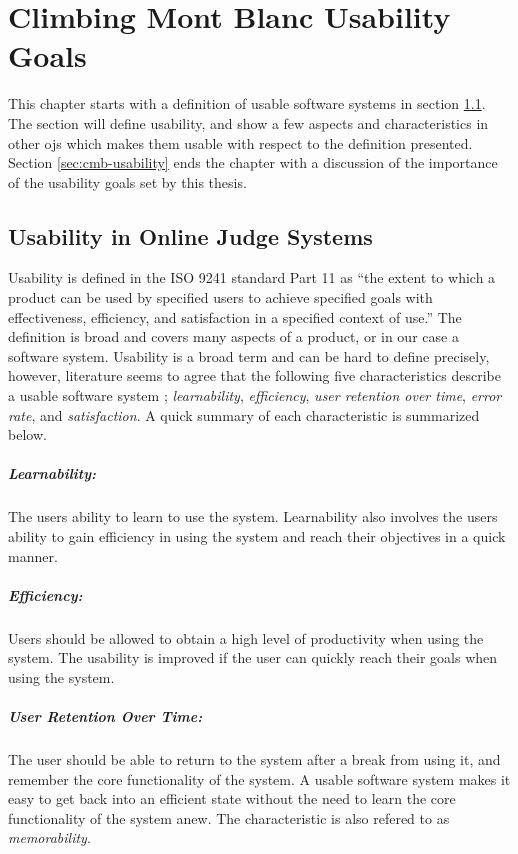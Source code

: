 \chapter{Climbing Mont Blanc Usability Goals}
\label{ch:design}
This chapter starts with a definition of usable software systems in section \ref{sec:usability-def}. The section will define usability, and show a few aspects and characteristics in other \glspl{oj} which makes them usable with respect to the definition presented. Section \ref{sec:cmb-usability} ends the chapter with a discussion of the importance of the usability goals set by this thesis.

\section{Usability in Online Judge Systems}
\label{sec:usability-def}
Usability is defined in the ISO 9241 standard Part 11 \cite{ISO1998} as ``the extent to which a product can be used by specified users to achieve specified goals with effectiveness, efficiency, and satisfaction in a specified context of use.'' The definition is broad and covers many aspects of a product, or in our case a software system. Usability is a broad term and can be hard to define precisely, however, literature seems to agree that the following five characteristics describe a usable software system  \cite{holzinger2005, ferre2001}; \textit{learnability}, \textit{efficiency}, \textit{user retention over time}, \textit{error rate}, and \textit{satisfaction}. A quick summary of each characteristic is summarized below.

\paragraph*{Learnability:} The users ability to learn to use the system. Learnability also involves the users ability to gain efficiency in using the system and reach their objectives in a quick manner.

\paragraph*{Efficiency:} Users should be allowed to obtain a high level of productivity when using the system. The usability is improved if the user can quickly reach their goals when using the system.

\paragraph*{User Retention Over Time:} The user should be able to return to the system after a break from using it, and remember the core functionality of the system. A usable software system makes it easy to get back into an efficient state without the need to learn the core functionality of the system anew. The characteristic is also refered to as \textit{memorability}.

